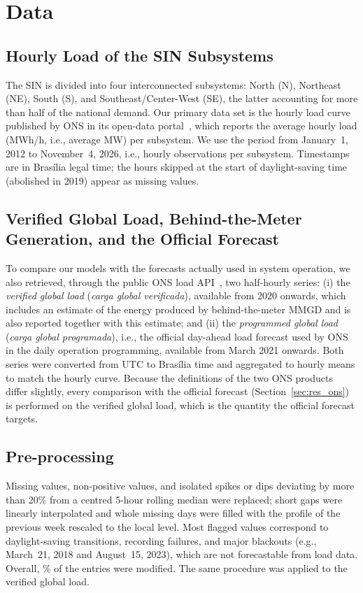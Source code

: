 \section{Data}
\label{sec:data}

\subsection{Hourly Load of the SIN Subsystems}
The SIN is divided into four interconnected subsystems: North (N), Northeast (NE), South (S), and Southeast/Center-West (SE), the latter accounting for more than half of the national demand. Our primary data set is the hourly load curve published by ONS in its open-data portal~\cite{ons_opendata}, which reports the average hourly load (MWh/h, i.e., average MW) per subsystem. We use the period from January~1, 2012 to November~4, 2026, i.e., \NHours{} hourly observations per subsystem. Timestamps are in Bras\'ilia legal time; the hours skipped at the start of daylight-saving time (abolished in 2019) appear as missing values.

\subsection{Verified Global Load, Behind-the-Meter Generation, and the Official Forecast}
To compare our models with the forecasts actually used in system operation, we also retrieved, through the public ONS load API~\cite{ons_apicarga}, two half-hourly series: (i) the \emph{verified global load} (\emph{carga global verificada}), available from 2020 onwards, which includes an estimate of the energy produced by behind-the-meter MMGD and is also reported together with this estimate; and (ii) the \emph{programmed global load} (\emph{carga global programada}), i.e., the official day-ahead load forecast used by ONS in the daily operation programming, available from March 2021 onwards. Both series were converted from UTC to Bras\'ilia time and aggregated to hourly means to match the hourly curve. Because the definitions of the two ONS products differ slightly, every comparison with the official forecast (Section~\ref{sec:res_ons}) is performed on the verified global load, which is the quantity the official forecast targets.

\subsection{Pre-processing}
Missing values, non-positive values, and isolated spikes or dips deviating by more than 20\% from a centred 5-hour rolling median were replaced; short gaps were linearly interpolated and whole missing days were filled with the profile of the previous week rescaled to the local level. Most flagged values correspond to daylight-saving transitions, recording failures, and major blackouts (e.g., March~21, 2018 and August~15, 2023), which are not forecastable from load data. Overall, \CleanedPct\% of the entries were modified. The same procedure was applied to the verified global load.


